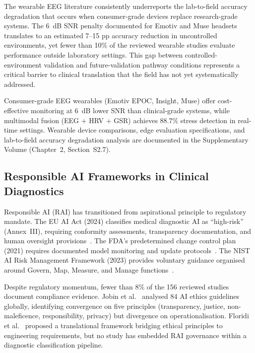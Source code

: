 
The wearable EEG literature consistently underreports the lab-to-field accuracy degradation that occurs when consumer-grade devices replace research-grade systems. The 6~dB SNR penalty documented for Emotiv and Muse headsets translates to an estimated 7--15 pp accuracy reduction in uncontrolled environments, yet fewer than 10\% of the reviewed wearable studies evaluate performance outside laboratory settings. This gap between controlled-environment validation and future-validation pathway conditions represents a critical barrier to clinical translation that the field has not yet systematically addressed.
\fi %

\noindent Consumer-grade EEG wearables (Emotiv EPOC, Insight, Muse) offer cost-effective monitoring at 6~dB lower SNR than clinical-grade systems, while multimodal fusion (EEG + HRV + GSR) achieves 88.7\% stress detection in real-time settings. Wearable device comparisons, edge evaluation specifications, and lab-to-field accuracy degradation analysis are documented in the Supplementary Volume (Chapter~2, Section~S2.7).

\subsection{Responsible AI Frameworks in Clinical Diagnostics}

Responsible AI (RAI) has transitioned from aspirational principle to regulatory mandate. The EU AI Act (2024) classifies medical diagnostic AI as ``high-risk'' (Annex~III), requiring conformity assessments, transparency documentation, and human oversight provisions~\cite{eu2021aiact}. The FDA's predetermined change control plan (2021) requires documented model monitoring and update protocols~\cite{fda2021aiml}. The NIST AI Risk Management Framework (2023) provides voluntary guidance organised around Govern, Map, Measure, and Manage functions~\cite{nist2023airmf}.

Despite regulatory momentum, fewer than 8\% of the 156 reviewed studies document compliance evidence. Jobin et al.~\cite{jobin2019ethics} analysed 84 AI ethics guidelines globally, identifying convergence on five principles (transparency, justice, non-maleficence, responsibility, privacy) but divergence on operationalisation. Floridi et al.~\cite{floridi2019trustworthy} proposed a translational framework bridging ethical principles to engineering requirements, but no study has embedded RAI governance within a diagnostic classification pipeline.

